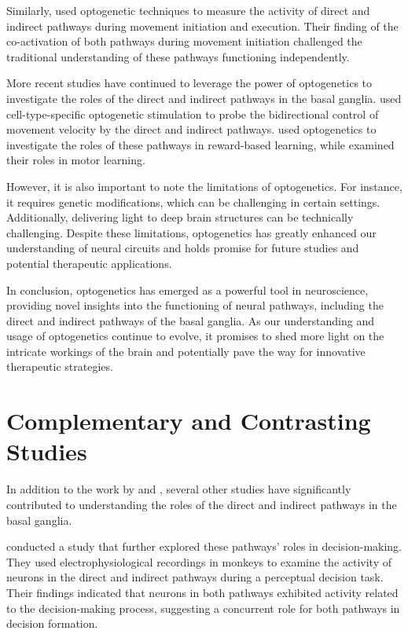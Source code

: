 \documentclass[10pt]{article}
\begin{document}
\begin{sloppypar}
  Similarly, \cite{cui_concurrent_2013} used optogenetic techniques to measure the activity of direct and indirect pathways during movement initiation and execution. Their finding of the co-activation of both pathways during movement initiation challenged the traditional understanding of these pathways functioning independently.

  More recent studies have continued to leverage the power of optogenetics to investigate the roles of the direct and indirect pathways in the basal ganglia. \cite{yttri_opponent_2016} used cell-type-specific optogenetic stimulation to probe the bidirectional control of movement velocity by the direct and indirect pathways. \cite{guillaumin_optogenetic_2020} used optogenetics to investigate the roles of these pathways in reward-based learning, while \cite{hilt_evidence_2016} examined their roles in motor learning.

  However, it is also important to note the limitations of optogenetics. For instance, it requires genetic modifications, which can be challenging in certain settings. Additionally, delivering light to deep brain structures can be technically challenging. Despite these limitations, optogenetics has greatly enhanced our understanding of neural circuits and holds promise for future studies and potential therapeutic applications.

  In conclusion, optogenetics has emerged as a powerful tool in neuroscience, providing novel insights into the functioning of neural pathways, including the direct and indirect pathways of the basal ganglia. As our understanding and usage of optogenetics continue to evolve, it promises to shed more light on the intricate workings of the brain and potentially pave the way for innovative therapeutic strategies.

  \section{Complementary and Contrasting Studies}
  \label{sec:complementary-and-contrasting-studies}

  In addition to the work by \cite{cui_concurrent_2013} and \cite{kravitz_regulation_2010}, several other studies have significantly contributed to understanding the roles of the direct and indirect pathways in the basal ganglia.

  \cite{yttri_opponent_2016} conducted a study that further explored these pathways’ roles in decision-making. They used electrophysiological recordings in monkeys to examine the activity of neurons in the direct and indirect pathways during a perceptual decision task. Their findings indicated that neurons in both pathways exhibited activity related to the decision-making process, suggesting a concurrent role for both pathways in decision formation.


\end{sloppypar}
\end{document}
